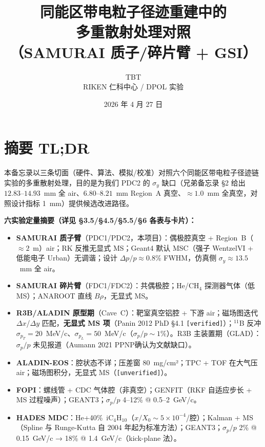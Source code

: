 \documentclass[a4paper, 11pt]{article}
\title{\textbf{同能区带电粒子径迹重建中的 \\ 多重散射处理对照 \\ （SAMURAI 质子/碎片臂 + GSI）}}
\author{TBT \\ RIKEN 仁科中心 / DPOL 实验}
\date{2026 年 4 月 27 日}
\begin{document}
\maketitle
\tableofcontents
\clearpage

\section{摘要 TL;DR}

本备忘录以三条切面（硬件、算法、模拟/校准）对照六个同能区带电粒子径迹链实验的多重散射处理，目的是为我们 PDC2 的 $\sigma_y$ 缺口（兄弟备忘录 §2 给出 $12.83$--$14.93$~mm 全 air、$6.80$--$8.21$~mm Region~A 真空、$\approx 1.0$~mm 全真空，对照设计指标 1~mm）提供候选改进路径。

\textbf{六实验定量摘要（详见 §3.5/§4.5/§5.5/§6 各表与卡片）：}

\begin{itemize}[leftmargin=2em,itemsep=0pt]
\item \textbf{SAMURAI 质子臂}（PDC1/PDC2，本项目）：偶极腔真空 + Region~B（$\approx 2$~m）air；RK 反推无显式 MS；Geant4 默认 MSC（强子 WentzelVI + 低能电子 Urban）无调谐；设计 $\Delta p/p \approx 0.8\%$ FWHM，仿真侧 $\sigma_y \approx 13.5$~mm 全 air。
\item \textbf{SAMURAI 碎片臂}（FDC1/FDC2）：共偶极腔；He/CH$_4$ 探测器气体（低 MS）；ANAROOT 直线 $B\rho$，无显式 MS。
\item \textbf{R3B/ALADIN 原型期}（Cave~C）：靶室真空铝腔 + 下游 air；磁场图迭代 $\Delta x$/$\Delta y$ 匹配，\textbf{无显式 MS 项}（Panin 2012 PhD §4.1 \texttt{[verified]}）；$^{11}$B 反冲 $\sigma_{p_T}=20$~MeV/c、$\sigma_{p_L}=50$~MeV/c（$\sigma_p/p \sim 1\%$）。R3B 主装置期（GLAD）：$\sigma_p/p$ 未见报道（Aumann 2021 PPNP确认为文献缺口）。
\item \textbf{ALADIN-EOS}：腔状态不详；压差窗 80~mg/cm²；TPC + TOF 在大气压 air；磁场图积分，无显式 MS（\texttt{[unverified]}）。
\item \textbf{FOPI}：螺线管 + CDC 气体腔（非真空）；GENFIT（RKF 自适应步长 + MS 过程噪声）；GEANT3；$\sigma_p/p$ 4--12\% @ 0.5--2~GeV/c。
\item \textbf{HADES MDC}：He+40\%~iC$_4$H$_{10}$（$x/X_0 \sim 5{\times}10^{-4}$/腔）；Kalman + MS（Spline 与 Runge-Kutta 自 2004 年起为标准方法）；GEANT3；$\sigma_p/p$ 2\% @ 0.15~GeV/c → 18\% @ 1.4~GeV/c（kick-plane 法）。
\end{itemize}
\end{document}
